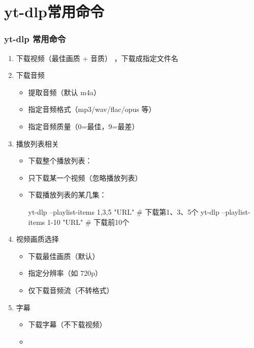 \documentclass[10pt,CJKmath]{ctexart}
\begin{document}
\part{yt-dlp常用命令}
\section{yt-dlp 常用命令}
\begin{enumerate}
	\item 下载视频（最佳画质 + 音质）	，下载成指定文件名 
	\item 下载音频
	
	\begin{itemize}
		\item 		提取音频（默认 m4a）		
		\item		指定音频格式（mp3/wav/flac/opus 等）
		\item		指定音频质量（0=最佳，9=最差）
	\end{itemize}
	\item  播放列表相关
	\begin{itemize}
		\item 下载整个播放列表：
		\item 只下载某一个视频（忽略播放列表）
		\item 下载播放列表的某几集：
		\begin{code}
			yt-dlp --playlist-items 1,3,5 "URL"   \# 下载第1、3、5个
			yt-dlp --playlist-items 1-10 "URL"    \# 下载前10个
		\end{code}
	\end{itemize}
	\item  视频画质选择
	\begin{itemize}
		\item 下载最佳画质（默认） 
		\item 指定分辨率（如 720p）
		\item 仅下载音频流（不转格式）
	\end{itemize}
	\item  字幕
	\begin{itemize}
		\item 下载字幕（不下载视频）
		\item

\end{itemize}
\end{enumerate}
\end{document}
